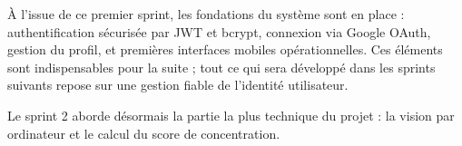 À l’issue de ce premier sprint, les fondations du système sont en place : authentification sécurisée par JWT et bcrypt, connexion via Google OAuth, gestion du profil, et premières interfaces mobiles opérationnelles. Ces éléments sont indispensables pour la suite ; tout ce qui sera développé dans les sprints suivants repose sur une gestion fiable de l’identité utilisateur.

Le sprint 2 aborde désormais la partie la plus technique du projet : la vision par ordinateur et le calcul du score de concentration. 